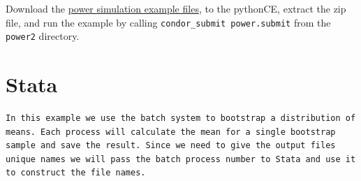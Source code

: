 \documentclass[
]{book}
\begin{document}
\begin{enumerate}
  Download the \href{examples_Python/power2.zip}{power simulation example files}, to the pythonCE, extract the zip
  file, and run the example by calling \texttt{condor\_submit\ power.submit}
  from the \texttt{power2} directory.
\end{enumerate}

\hypertarget{stata}{%
\section{Stata}\label{stata}}

\begin{verbatim}
In this example we use the batch system to bootstrap a distribution of
means. Each process will calculate the mean for a single bootstrap
sample and save the result. Since we need to give the output files
unique names we will pass the batch process number to Stata and use it
to construct the file names.
\end{verbatim}
\end{document}
